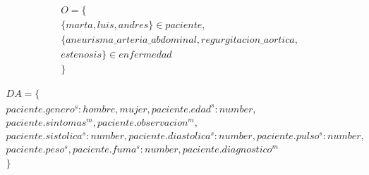 \documentclass[10pt, a4paper,spanish]{article}
\begin{document}
			\begin{multline*}
				O = \{ \\
					\{marta, luis, andres\} \in paciente, \\
					\{aneurisma\_arteria\_abdominal, regurgitacion\_aortica, \\
					estenosis\} \in enfermedad \\
				\}
			\end{multline*}

			\begin{multline*}
				DA = \{ \\
					paciente.genero^s:{hombre, mujer}, paciente.edad^s:number, \\
					paciente.sintomas^m, paciente.observacion^m, \\
					paciente.sistolica^s:number, paciente.diastolica^s:number, paciente.pulso^s:number, \\
					paciente.peso^s, paciente.fuma^s:number, paciente.diagnostico^m \\
				\}
			\end{multline*}
\end{document}
